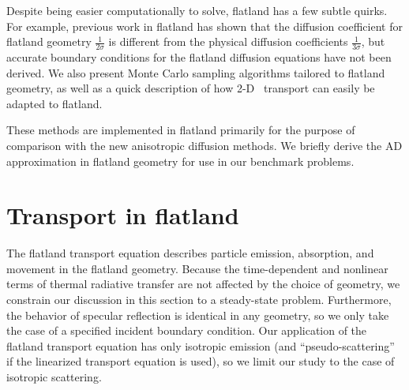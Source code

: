 Despite being easier computationally to solve, flatland has a few subtle quirks.
For example, previous work in flatland \cite{Asa2008,Lar2009c} has shown that the
diffusion coefficient for flatland geometry $\frac{1}{2\sigma}$ is different
from the physical diffusion coefficients $\frac{1}{3\sigma}$, but accurate
boundary conditions for the flatland diffusion equations have not been derived.
We also present Monte Carlo sampling algorithms tailored to flatland
geometry, as well as a quick description of how 2-D \SN\ transport can easily be
adapted to flatland.

These methods are implemented in flatland primarily for the purpose of
comparison with the new anisotropic diffusion methods. We briefly derive the
AD approximation in flatland geometry for use in our benchmark problems.

\clearpage
\section{Transport in flatland}

The flatland transport equation describes particle emission, absorption, and
movement in the flatland geometry.
Because the time-dependent and nonlinear terms of thermal radiative transfer are
not affected by the choice of geometry, we constrain our discussion in this
section to a steady-state problem. Furthermore, the behavior of specular
reflection is identical in any geometry, so we only take the case of a specified
incident boundary condition. Our application of the flatland transport equation
has only isotropic emission (and ``pseudo-scattering'' if the linearized
transport equation is used), so we limit our study to the case of isotropic
scattering.

